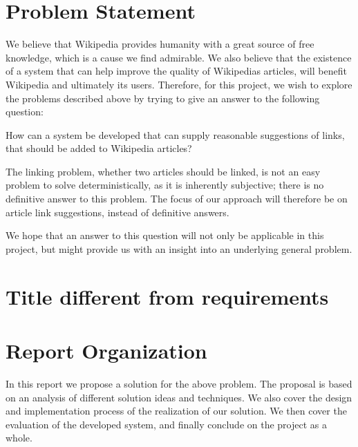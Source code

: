 \section{Problem Statement}\label{sec:problem_statement}

We believe that Wikipedia provides humanity with a great source of free knowledge, which is a cause we find admirable. We also believe that the existence of a system that can help improve the quality of Wikipedias articles, will benefit Wikipedia and ultimately its users. Therefore, for this project, we wish to explore the problems described above by trying to give an answer to the following question:

\begin{formal}
How can a system be developed that can supply reasonable suggestions of links, that should be added to Wikipedia articles?
\end{formal}

The linking problem, whether two articles should be linked, is not an easy problem to solve deterministically, as it is inherently subjective; there is no definitive answer to this problem. The focus of our approach will therefore be on article link suggestions, instead of definitive answers.

We hope that an answer to this question will not only be applicable in this project, but might provide us with an insight into an underlying general problem.



\section{Title different from requirements} %
\label{sec:title_different_from_requirements}


\section{Report Organization}
In this report we propose a solution for the above problem. The proposal is based on an analysis of different solution ideas and techniques. We also cover the design and implementation process of the realization of our solution. We then cover the evaluation of the developed system, and finally conclude on the project as a whole. 

